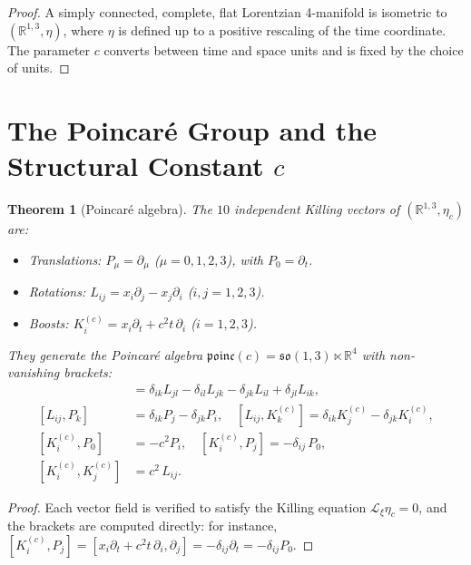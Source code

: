 \documentclass[12pt]{article}
\theoremstyle{plain}
\newtheorem{theorem}{Theorem}[section]
\theoremstyle{definition}
\theoremstyle{remark}
\newcommand{\R}{\mathbb{R}}
\begin{document}
\begin{proof}
A simply connected, complete, flat Lorentzian 4-manifold is isometric to $(\R^{1,3}, \eta)$, where $\eta$ is defined up to a positive rescaling of the time coordinate. The parameter $c$ converts between time and space units and is fixed by the choice of units.
\end{proof}


\section{The Poincar\'e Group and the Structural Constant $c$}
\label{sec:poincare}

\begin{theorem}[Poincar\'e algebra]\label{thm:poincare-algebra}
The $10$ independent Killing vectors of $(\R^{1,3}, \eta_c)$ are:
\begin{itemize}
    \item Translations: $P_\mu = \partial_\mu$ ($\mu = 0,1,2,3$), with $P_0 = \partial_t$.
    \item Rotations: $L_{ij} = x_i\partial_j - x_j\partial_i$ ($i,j = 1,2,3$).
    \item Boosts: $K_i^{(c)} = x_i\partial_t + c^2 t\,\partial_i$ ($i = 1,2,3$).
\end{itemize}
They generate the Poincar\'e algebra $\mathfrak{poinc}(c) = \mathfrak{so}(1,3) \ltimes \R^4$ with non-vanishing brackets:
\begin{align}
[L_{ij}, L_{kl}] &= \delta_{ik}L_{jl} - \delta_{il}L_{jk} - \delta_{jk}L_{il} + \delta_{jl}L_{ik}, \label{eq:LL}\\
[L_{ij}, P_k] &= \delta_{ik}P_j - \delta_{jk}P_i, \quad [L_{ij}, K_k^{(c)}] = \delta_{ik}K_j^{(c)} - \delta_{jk}K_i^{(c)}, \label{eq:LP}\\
[K_i^{(c)}, P_0] &= -c^2 P_i, \quad [K_i^{(c)}, P_j] = -\delta_{ij}\,P_0, \label{eq:KP}\\
[K_i^{(c)}, K_j^{(c)}] &= c^2\,L_{ij}. \label{eq:KK}
\end{align}
\end{theorem}

\begin{proof}
Each vector field is verified to satisfy the Killing equation $\mathcal{L}_\xi\eta_c = 0$, and the brackets are computed directly: for instance, $[K_i^{(c)}, P_j] = [x_i\partial_t + c^2 t\,\partial_i, \partial_j] = -\delta_{ij}\partial_t = -\delta_{ij}P_0$.
\end{proof}
\end{document}
